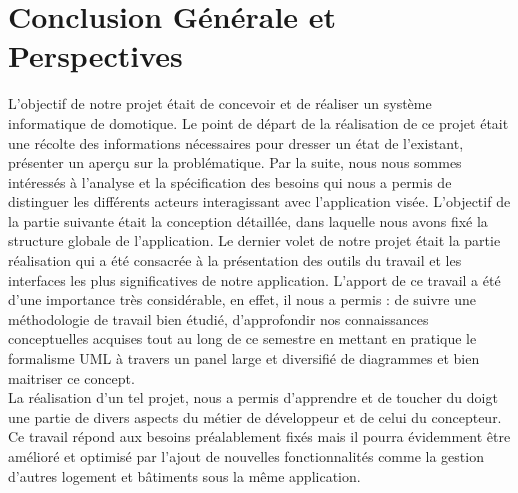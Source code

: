 \chapter{Conclusion Générale et Perspectives}
\pagestyle{fancy}
\fancyhf{}
\fancyhead[R]{\bfseries\rightmark}
\fancyfoot[R]{\thepage}
\renewcommand{\headrulewidth}{0.5pt}
\renewcommand{\footrulewidth}{0pt}
\renewcommand{\chaptermark}[1]{\markboth{\MakeUppercase{\chaptername~\thechapter. #1 }}{}}
\renewcommand{\sectionmark}[1]{\markright{\thechapter.\thesection~ #1}}

\begin{spacing}{1.2}

L’objectif de notre projet était de concevoir et de réaliser un système informatique de domotique. Le point de départ de la réalisation de ce projet était une récolte des informations nécessaires pour dresser un état de l’existant, présenter un aperçu sur la problématique. Par la suite, nous nous sommes intéressés à l’analyse et la spécification des besoins qui nous a permis de distinguer les différents acteurs interagissant avec l’application visée. L’objectif de la partie suivante était la conception détaillée, dans laquelle nous avons fixé la structure globale de l’application. Le dernier volet de notre projet était la partie réalisation qui a été consacrée à la présentation des outils du travail et les interfaces les plus significatives de notre application. L’apport de ce travail a été d’une importance très considérable, en effet, il nous a permis : de suivre une méthodologie de travail bien étudié, d’approfondir nos connaissances conceptuelles acquises tout au long de ce semestre en mettant en pratique le formalisme UML à travers un panel large et diversifié de diagrammes et bien maitriser ce concept. \\
La réalisation d’un tel projet, nous a permis d’apprendre et de toucher du doigt une partie de divers aspects du métier de développeur et de celui du concepteur.
\\
Ce travail répond aux besoins préalablement fixés mais il pourra évidemment être amélioré et optimisé par l’ajout de nouvelles fonctionnalités comme la gestion d'autres logement et bâtiments sous la même application.
\end{spacing}